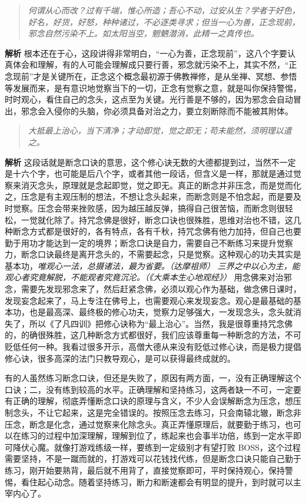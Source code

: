 \begin{quote}\it
    何谓从心而改？过有千端，惟心所造；吾心不动，过安从生？学者于好色，好名，好货，好怒，种种诸过，不必逐类寻求；但当一心为善，正念现前，邪念自然污染不上。如太阳当空，魍魉潜消，此精一之真传也。
\end{quote}

\textbf{解析} 根本还在于心，这段讲得非常明白，“一心为善，正念现前”，这八个字要认真体会和理解，有的人可能会理解成只要行善，邪念就污染不上，其实不然，“正念现前”才是关键所在，正念这个概念最初源于佛教禅修，是从坐禅、冥想、参悟等发展而来，是有意识地觉察当下的一切，正念有觉察之意，就是叫你保持警惕，时时观心，看住自己的念头，这点至为关键。光行善是不够的，因为邪念会自动冒出，邪念会入侵你的头脑，你必须具备对治之力，要立刻断除而不能被其附体。

\begin{quote}\it
    大抵最上治心，当下清净；才动即觉，觉之即无；苟未能然，须明理以遣之。
\end{quote}

\textbf{解析} 这段话就是断念口诀的意思，这个修心诀无数的大德都提到过，当然不一定是十六个字，也可能是后八个字，或者其他一段话，但含义是一样，那就是通过觉察来消灭念头，原理就是念起即觉，觉之即无。真正的断念并非压念，而是觉而化之，压念是有主观压制的想法，不想让念头起来，而断念则是不怕念起，而是要及时觉察。压念会带来挫败感，因为越压越反弹，搞得自己很苦恼，而断念则很轻松，一觉就化除了。持咒念佛是很好，断念口诀也很殊胜，思维对治也不错，这几种断念方式都是很好的，各有特点，各有千秋，持咒念佛有他力加持，但自己也要勤于用功才能达到一定的境界；断念口诀是自力，需要自己不断练习来提升觉察力，断念口诀最终是离开念头的，不需要起念，只是觉察。这种观心的功夫其实是基本功，\textit{唯观心一法，总摄诸法，最为省要。（达摩祖师）} \textit{三界之中以心为主，能观心者究竟解脱，不能观者究竟沉沦。（《大乘本生心地观经》）} 用念佛来对治邪念，需要先发现邪念来了，然后赶紧念佛，必须以观心作为基础，做念佛日课时，发现妄念起来了，马上专注在佛号上，也需要观心来发现妄念。观心是最基础的基本功，也是最高深、最终极的修心功夫，觉察力足够强大，一发现念头，念头就消失了，所以《了凡四训》把修心诀称为“最上治心”。当然，我是很尊重持咒念佛的，的确很殊胜，这几种断念方式都很好，我们应该尊重每一种断念的方法，不可贬低任何一种。我看过很多开示，高僧大德从来没有贬低过修心诀，而是极力提倡修心诀，很多高深的法门只教导观心，是可以获得最终成就的。

有的人虽然练习断念口诀，但还是失败了，原因有两方面，一，没有正确理解这个口诀；二，没有练到较高的水平。正确理解和坚持练习，这两者缺一不可，一定要有正确的理解，彻底弄懂断念口诀的原理与含义，不少人会误解断念为压念，想压制念头，不让它起来，这是完全错误的。按照压念去练习，只会南辕北辙，断念非压念，断念是化念，通过觉察来化除念头。真正弄懂原理后，就要勤于练习，也可以在练习的过程中加深理解，理解到位了，练起来也会事半功倍，练到一定水平即可降伏心魔。就像打游戏练级一样，要练到一定级别才有望打败 BOSS，这个过程需要坚持，不是一蹴而就的，打游戏可以花钱找代练，但是断念口诀只能自己勤于练习，刚开始要熟背，最后就不用背了，直接觉察即可，平时保持观心，保持警惕，看住起心动念。随着坚持练习，断力和断速都会有明显的提升，到时就可以主宰内心了。

